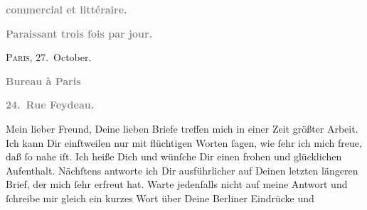 \begin{ledgroupsized}[t]{13cm}
           \pstart
           \begin{otherlanguage}{french}\textcolor{gray}{\textbf{commercial et littéraire.}}\end{otherlanguage}\pend
           \pstart
           \begin{otherlanguage}{french}\textcolor{gray}{\textbf{\textbf{Paraissant trois fois par jour.}}}\end{otherlanguage}\hfill \textsc{Paris}, 27. October.\pend
           \pstart
           \begin{otherlanguage}{french}\textcolor{gray}{\textbf{\textbf{Bureau à Paris}}}\end{otherlanguage}\pend
           \pstart
           \begin{otherlanguage}{french}\textcolor{gray}{\textbf{\textbf{24. Rue Feydeau.}}}\end{otherlanguage}\pend
           \pstart{}Mein lieber Freund,\pend\pstart
           Deine lieben Briefe treffen mich in einer Zeit größter Arbeit. Ich kann Dir
               einſtweilen nur mit flüchtigen Worten ſagen, wie ſehr ich mich freue, daß \label{K_L02788-1v}\label{K_L02788-1h} ſo nahe iſt. Ich heiße Dich \label{K_L02788-2v}\label{K_L02788-2h} und wünſche Dir einen frohen
               und glücklichen Aufenthalt. Nächſtens antworte ich Dir ausführlicher auf Deinen
               letzten längeren Brief, der mich ſehr erfreut hat. {\pb}Warte jedenfalls nicht auf meine Antwort und ſchreibe mir gleich ein kurzes Wort
               über Deine Berliner  Eindrücke und

\end{ledgroupsized}
